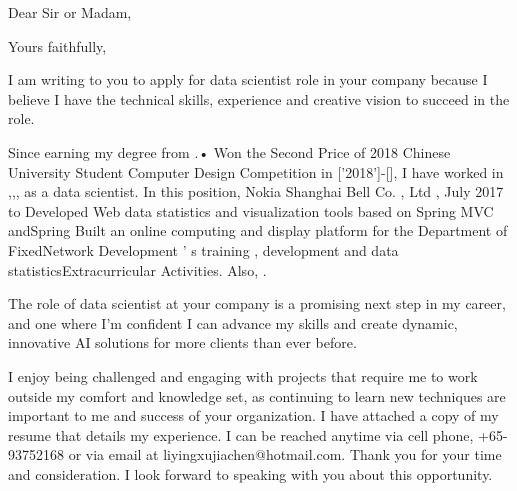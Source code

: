 \documentclass[11pt,a4paper,sans]{moderncv}        %
\begin{document}
\recipient{\quad}{\quad}
\date{March 07 2020}
\opening{Dear Sir or Madam,}
\closing{Yours faithfully,}
\makelettertitle

I am writing to you to apply for data scientist role in your company because I believe I have the technical skills, experience and creative vision to succeed in the role.



Since earning my degree from .• Won the Second Price of 2018 Chinese University Student Computer Design Competition in ['2018']-[], I have worked in ,,, as a data scientist. In this position, Nokia Shanghai Bell Co. , Ltd , July 2017 to Developed Web data statistics and visualization tools based on Spring MVC andSpring Built an online computing and display platform for the Department of FixedNetwork Development ’ s training , development and data statisticsExtracurricular Activities. Also, . 

The role of data scientist at your company is a promising next step in my career, and one where I’m confident I can advance my skills and create dynamic, innovative AI solutions for more clients than ever before.

I enjoy being challenged and engaging with projects that require me to work outside my comfort and knowledge set, as continuing to learn new techniques are important to me and success of your organization.
I have attached a copy of my resume that details my experience. I can be reached anytime via cell phone, +65-93752168 or via email at liyingxujiachen@hotmail.com.
Thank you for your time and consideration. I look forward to speaking with you about this opportunity.


\makeletterclosing
\end{document}
